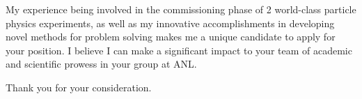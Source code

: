 \documentclass[12pt,letterpaper,sans]{moderncv}        %
\begin{document}

My experience being involved in the commissioning phase of 2 world-class
particle physics experiments, as well as my innovative accomplishments in
developing novel methods for problem solving makes me a unique candidate to
apply for your position. I believe I can make a significant impact to your team
of academic and scientific prowess in your group at ANL.


Thank you for your consideration.

\makeletterclosing
\end{document}
